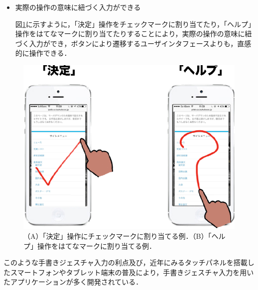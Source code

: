 \begin{itemize}
 \item 実際の操作の意味に紐づく入力ができる
 
 図\ref{fig:semantic}に示すように，「決定」操作をチェックマークに割り当てたり，「ヘルプ」操作をはてなマークに割り当てたりすることにより，実際の操作の意味に紐づく入力ができ，ボタンにより遷移するユーザインタフェースよりも，直感的に操作できる．
\end{itemize}

\begin{figure} [htbp]
\centering
\includegraphics [width=0.5\columnwidth]{img/semantic.eps}
\caption{（A）「決定」操作にチェックマークに割り当てる例．（B）「ヘルプ」操作をはてなマークに割り当てる例．}
\label{fig:semantic}
\end{figure}

このような手書きジェスチャ入力の利点及び，近年にみるタッチパネルを搭載したスマートフォンやタブレット端末の普及により，手書きジェスチャ入力を用いたアプリケーションが多く開発されている．

